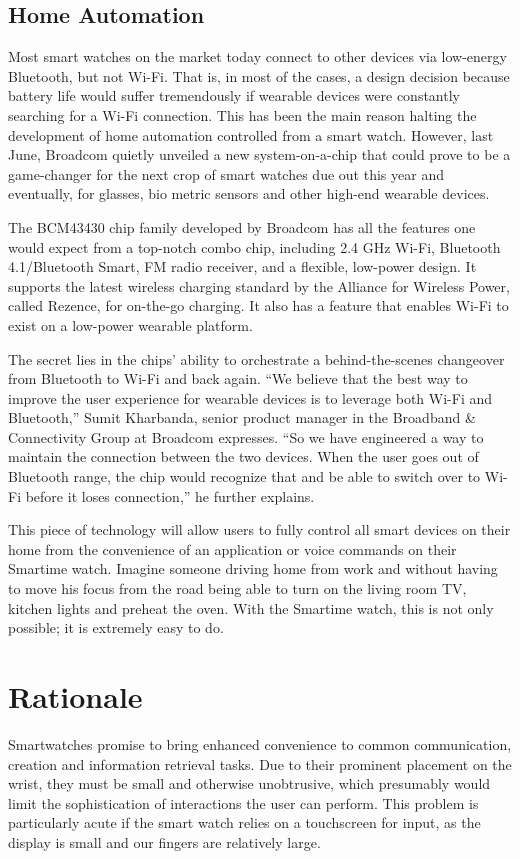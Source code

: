 \documentclass{article}
\begin{document}
\subsection{Home Automation}
Most smart watches on the market today connect to other devices via low-energy Bluetooth, but not Wi-Fi. That is, in most of the cases, a design decision because battery life would suffer tremendously if wearable devices were constantly searching for a Wi-Fi connection. This has been the main reason halting the development of home automation controlled from a smart watch. However, last June, Broadcom quietly unveiled a new system-on-a-chip that could prove to be a game-changer for the next crop of smart watches due out this year and eventually, for glasses, bio metric sensors and other high-end wearable devices.\cite{murry2014}

The BCM43430 chip family developed by Broadcom has all the features one would expect from a top-notch combo chip, including 2.4 GHz Wi-Fi, Bluetooth 4.1/Bluetooth Smart, FM radio receiver, and a flexible, low-power design. It supports the latest wireless charging standard by the Alliance for Wireless Power, called Rezence, for on-the-go charging. It also has a feature that enables Wi-Fi to exist on a low-power wearable platform.

The secret lies in the chips' ability to orchestrate a behind-the-scenes changeover from Bluetooth to Wi-Fi and back again. ``We believe that the best way to improve the user experience for wearable devices is to leverage both Wi-Fi and Bluetooth,'' Sumit Kharbanda, senior product manager in the Broadband \& Connectivity Group at Broadcom expresses. ``So we have engineered a way to maintain the connection between the two devices. When the user goes out of Bluetooth range, the chip would recognize that and be able to switch over to Wi-Fi before it loses connection,'' he further explains. 

This piece of technology will allow users to fully control all smart devices on their home from the convenience of an application or voice commands on their Smartime watch. Imagine someone driving home from work and without having to move his focus from the road being able to turn on the living room TV, kitchen lights and preheat the oven. With the Smartime watch, this is not only possible; it is extremely easy to do.


\section{Rationale}
Smartwatches promise to bring enhanced convenience to common communication, creation and information retrieval tasks. Due to their prominent placement on the wrist, they must be small and otherwise unobtrusive, which presumably would limit the sophistication of interactions the user can perform. This problem is particularly acute if the smart watch relies on a touchscreen for input, as the display is small and our fingers are relatively large. 
\end{document}
